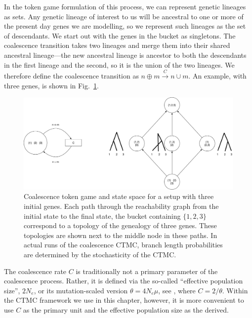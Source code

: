 \documentclass[graybox]{svmult}
\newcommand{\trans}[3]{\ensuremath{#1 \xrightarrow{#2} #3}}
\begin{document}
In the token game formulation of this process, we can represent genetic lineages as sets. Any genetic lineage of interest to us will be ancestral to one or more of the present day genes we are modelling, so we represent such lineages as the set of descendants. We start out with the genes in the bucket as singletons. The coalescence transition takes two lineages and merge them into their shared ancestral lineage---the new ancestral lineage is ancestor to both the descendants in the first lineage and the second, so it is the union of the two lineages. We therefore define the coalescence transition as \trans{n \oplus m}{C}{n \cup m}. An example, with three genes, is shown in Fig.~\ref{fig:coalescence-CPN}.

\begin{figure}[t]
\sidecaption[t]
\includegraphics[scale=.25]{figures/coalescence-CPN}
\caption{Coalescence token game and state space for a setup with three initial genes. Each path through the reachability graph from the initial state to the final state, the bucket containing $\{1,2,3\}$ correspond to a topology of the genealogy of three genes. These topologies are shown next to the middle node in these paths. In actual runs of the coalescence CTMC, branch length probabilities are determined by the stochasticity of the CTMC.}
\label{fig:coalescence-CPN}
\end{figure}

The coalescence rate $C$ is traditionally not a primary parameter of the coalescence process. Rather, it is defined via the so-called ``effective population size'', $2N_e$, or its mutation-scaled version $\theta=4 N_e \mu$, see \citet{Hein:2004ta}, where $C=2/\theta$. Within the CTMC framework we use in this chapter, however, it is more convenient to use $C$ as the primary unit and the effective population size as the derived.

\end{document}
